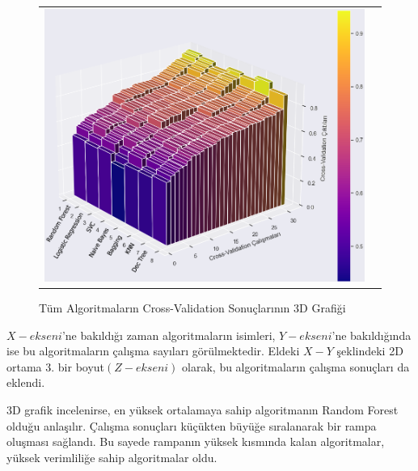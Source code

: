\documentclass[conference]{IEEEtran}
\begin{document}
\begin{figure}[!h]
	\centering
	\begin{center}
		\begin{tabular}{cc}
			\includegraphics[scale=0.375]{pictures/pic_24.png}&
		\end{tabular}
	\end{center}
	\caption{Tüm Algoritmaların Cross-Validation Sonuçlarının 3D Grafiği}
	\label{fig:24}
\end{figure}

\quad $X-ekseni$'ne bakıldığı zaman algoritmaların isimleri, $Y-ekseni$'ne bakıldığında ise bu algoritmaların çalışma sayıları görülmektedir. Eldeki $X-Y$ şeklindeki 2D ortama 3. bir boyut$(Z-ekseni)$ olarak, bu algoritmaların çalışma sonuçları da eklendi.

\quad 3D grafik incelenirse, en yüksek ortalamaya sahip algoritmanın Random Forest olduğu anlaşılır. Çalışma sonuçları küçükten büyüğe sıralanarak bir rampa oluşması sağlandı. Bu sayede rampanın yüksek kısmında kalan algoritmalar, yüksek verimliliğe sahip algoritmalar oldu.
\end{document}
